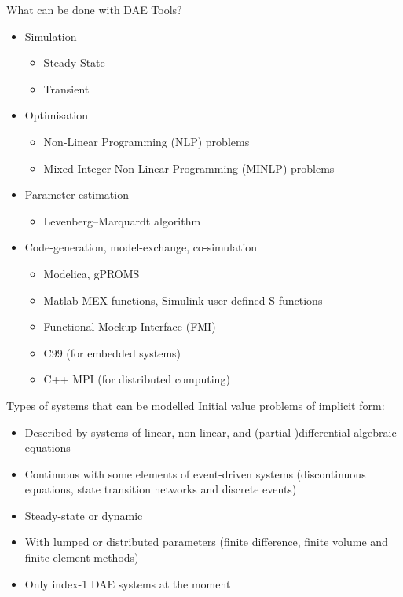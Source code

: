 \documentclass[compress,newPxFont,sthlmFooter]{beamer}
\begin{document}
\begin{frame}{What can be done with DAE Tools?} 
\begin{itemize}
  \item \alert{Simulation}
    \begin{itemize}
      \item Steady-State 
      \item Transient
    \end{itemize}
  \item \alert{Optimisation}
    \begin{itemize}
      \item Non-Linear Programming (NLP) problems
      \item Mixed Integer Non-Linear Programming (MINLP) problems
    \end{itemize}
  \item \alert{Parameter estimation}
    \begin{itemize}
      \item Levenberg–Marquardt algorithm
    \end{itemize}
  \item \alert{Code-generation}, \alert{model-exchange}, \alert{co-simulation} 
    \begin{itemize}
      \item Modelica, gPROMS
      \item Matlab MEX-functions, Simulink user-defined S-functions
      \item Functional Mockup Interface (FMI)
      \item C99 (for embedded systems)
      \item C++ MPI (for distributed computing) 
    \end{itemize}
\end{itemize}
\end{frame}

\begin{frame}{Types of systems that can be modelled}
  \alert{Initial value problems of implicit form}:
    \begin{itemize}
      \item Described by \alert{systems of linear, non-linear, and (partial-)differential} algebraic equations
      \item \alert{Continuous} with some elements of \alert{event-driven} systems 
            (discontinuous equations, state transition networks and discrete events) 
      \item \alert{Steady-state} or \alert{dynamic}
      \item With \alert{lumped} or \alert{distributed} parameters 
            (finite difference, finite volume and finite element methods)
      \item Only \alert{index-1} DAE systems at the moment
    \end{itemize}
\end{frame}
\end{document}

